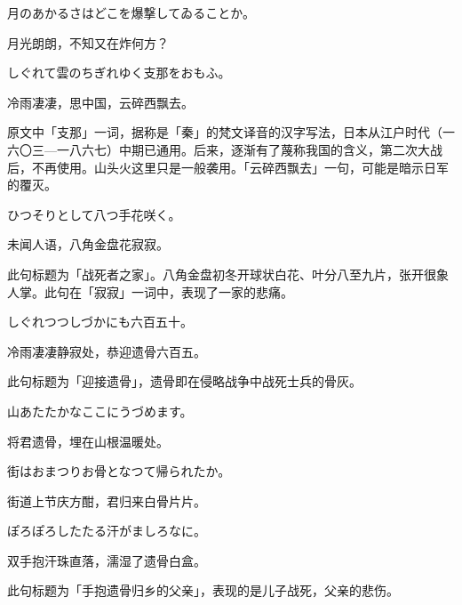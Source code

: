 \begin{haiku}
    {\FH 月のあかるさはどこを爆撃してゐることか。}

    {\FK 月光朗朗，不知又在炸何方？}
\end{haiku}

\begin{haiku}
    {\FH しぐれて雲のちぎれゆく支那をおもふ。}

    {\FK 冷雨凄凄，思中国，云碎西飘去。}

    {\FS 原文中「支那」一词，据称是「秦」的梵文译音的汉字写法，日本从江户时代（一六〇三—一八六七）中期已通用。后来，逐渐有了蔑称我国的含义，第二次大战后，不再使用。山头火这里只是一般袭用。「云碎西飘去」一句，可能是暗示日军的覆灭。}
\end{haiku}

\begin{haiku}
    {\FH ひつそりとして八つ手花咲く。}

    {\FK 未闻人语，八角金盘花寂寂。}

    {\FS 此句标题为「战死者之家」。八角金盘初冬开球状白花、叶分八至九片，张开很象人掌。此句在「寂寂」一词中，表现了一家的悲痛。}
\end{haiku}

\begin{haiku}
    {\FH しぐれつつしづかにも六百五十。}

    {\FK 冷雨凄凄静寂处，恭迎遗骨六百五。}

    {\FS 此句标题为「迎接遗骨」，遗骨即在侵略战争中战死士兵的骨灰。}
\end{haiku}

\begin{haiku}
    {\FH 山あたたかなここにうづめます。}

    {\FK 将君遗骨，埋在山根温暖处。}
\end{haiku}

\begin{haiku}
    {\FH 街はおまつりお骨となつて帰られたか。}

    {\FK 街道上节庆方酣，君归来白骨片片。}
\end{haiku}

\begin{haiku}
    {\FH ぽろぽろしたたる汗がましろなに。}

    {\FK 双手抱汗珠直落，濡湿了遗骨白盒。}

    {\FS 此句标题为「手抱遗骨归乡的父亲」，表现的是儿子战死，父亲的悲伤。}
\end{haiku}

